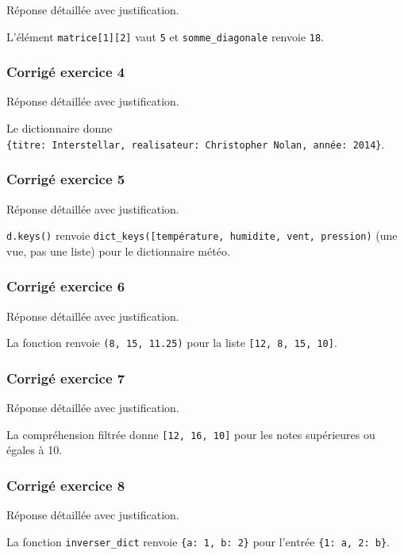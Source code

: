 Réponse détaillée avec justification.

L'élément \texttt{matrice{[}1{]}{[}2{]}} vaut \texttt{5} et
\texttt{somme\_diagonale} renvoie \texttt{18}.

\subsubsection{Corrigé exercice 4}

Réponse détaillée avec justification.

Le dictionnaire donne
\texttt{\{\textquotesingle{}titre\textquotesingle{}:\ \textquotesingle{}Interstellar\textquotesingle{},\ \textquotesingle{}realisateur\textquotesingle{}:\ \textquotesingle{}Christopher\ Nolan\textquotesingle{},\ \textquotesingle{}année\textquotesingle{}:\ 2014\}}.

\subsubsection{Corrigé exercice 5}

Réponse détaillée avec justification.

\texttt{d.keys()} renvoie
\texttt{dict\_keys({[}\textquotesingle{}température\textquotesingle{},\ \textquotesingle{}humidite\textquotesingle{},\ \textquotesingle{}vent\textquotesingle{},\ \textquotesingle{}pression\textquotesingle{}{]})}
(une vue, pas une liste) pour le dictionnaire météo.

\subsubsection{Corrigé exercice 6}

Réponse détaillée avec justification.

La fonction renvoie \texttt{(8,\ 15,\ 11.25)} pour la liste
\texttt{{[}12,\ 8,\ 15,\ 10{]}}.

\subsubsection{Corrigé exercice 7}

Réponse détaillée avec justification.

La compréhension filtrée donne \texttt{{[}12,\ 16,\ 10{]}} pour les
notes supérieures ou égales à 10.

\subsubsection{Corrigé exercice 8}

Réponse détaillée avec justification.

La fonction \texttt{inverser\_dict} renvoie
\texttt{\{\textquotesingle{}a\textquotesingle{}:\ 1,\ \textquotesingle{}b\textquotesingle{}:\ 2\}}
pour l'entrée
\texttt{\{1:\ \textquotesingle{}a\textquotesingle{},\ 2:\ \textquotesingle{}b\textquotesingle{}\}}.
